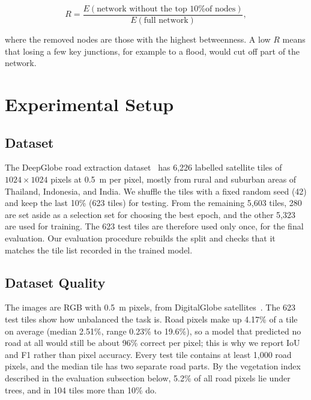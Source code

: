 \documentclass{ieeeaccess}
\begin{document}
\begin{equation}
R = \frac{E(\text{network without the top 10\% of nodes})}{E(\text{full network})},
\label{eq:resilience}
\end{equation}

where the removed nodes are those with the highest betweenness. A low $R$ means that losing a few key junctions, for example to a flood, would cut off part of the network.

\section{Experimental Setup}
\label{sec:setup}

\subsection{Dataset}

The DeepGlobe road extraction dataset~\cite{demir2018deepglobe} has 6,226 labelled satellite tiles of $1024 \times 1024$ pixels at 0.5~m per pixel, mostly from rural and suburban areas of Thailand, Indonesia, and India. We shuffle the tiles with a fixed random seed (42) and keep the last 10\% (623 tiles) for testing. From the remaining 5,603 tiles, 280 are set aside as a selection set for choosing the best epoch, and the other 5,323 are used for training. The 623 test tiles are therefore used only once, for the final evaluation. Our evaluation procedure rebuilds the split and checks that it matches the tile list recorded in the trained model.

\subsection{Dataset Quality}

The images are RGB with 0.5~m pixels, from DigitalGlobe satellites~\cite{demir2018deepglobe}. The 623 test tiles show how unbalanced the task is. Road pixels make up 4.17\% of a tile on average (median 2.51\%, range 0.23\% to 19.6\%), so a model that predicted no road at all would still be about 96\% correct per pixel; this is why we report IoU and F1 rather than pixel accuracy. Every test tile contains at least 1,000 road pixels, and the median tile has two separate road parts. By the vegetation index described in the evaluation subsection below, 5.2\% of all road pixels lie under trees, and in 104 tiles more than 10\% do.
\end{document}
